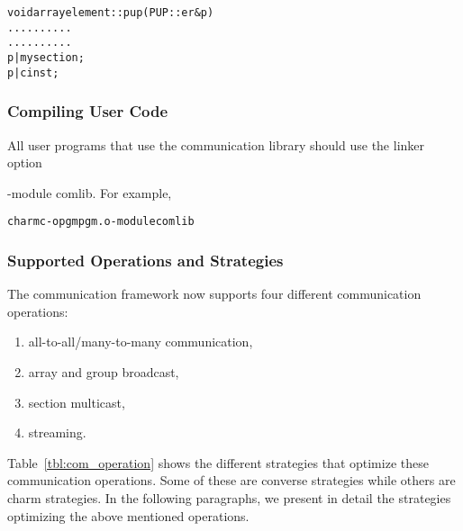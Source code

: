 \begin{alltt}
  void arrayelement::pup(PUP::er &p){
      ..........
      ..........
      p | mysection;
      p | cinst;
  }
\end{alltt}

\subsubsection{Compiling User Code}

All user programs that use the communication library should use the
linker option {\textrm{-module comlib}. For example,
\begin{alltt}
charmc -o pgm pgm.o -module comlib
\end{alltt}


\subsubsection{Supported Operations and Strategies}

The communication framework now supports four different communication
operations:
\begin{enumerate}
\item all-to-all/many-to-many communication,
\item array and group broadcast,
\item section multicast,
\item streaming.
\end{enumerate}
Table~\ref{tbl:com_operation} shows the different strategies that optimize these
communication operations. Some of these are converse strategies while others are
charm strategies. In the following paragraphs, we present in detail the
strategies optimizing the above mentioned operations.

}

